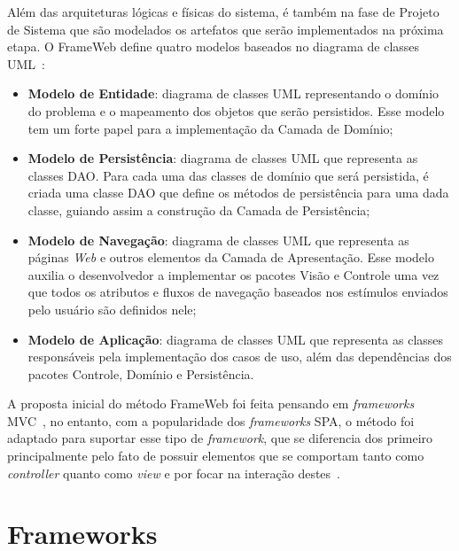 Além das arquiteturas lógicas e físicas do sistema, é também na fase de Projeto de Sistema
que são modelados os artefatos que serão implementados na próxima etapa. O FrameWeb define
quatro modelos baseados no diagrama de classes UML~\cite{souza:2007,souza:2020}:


\begin{itemize}
    \item \textbf{Modelo de Entidade}: diagrama de classes UML representando o domínio do 
        problema e o mapeamento dos objetos que serão persistidos. Esse modelo tem um forte
        papel para a implementação da Camada de Domínio;

    \item \textbf{Modelo de Persistência}: diagrama de classes UML que representa as classes
        DAO. Para cada uma das classes de domínio que será persistida, é criada uma classe DAO
        que define os métodos de persistência para uma dada classe, guiando assim a 
        construção da Camada de Persistência;
    
    \item \textbf{Modelo de Navegação}: diagrama de classes UML que representa as páginas \textit{Web}
        e outros elementos da Camada de Apresentação. Esse modelo auxilia o desenvolvedor a
        implementar os pacotes Visão e Controle uma vez que todos os atributos e fluxos de 
        navegação baseados nos estímulos enviados pelo usuário são definidos nele;

    \item \textbf{Modelo de Aplicação}: diagrama de classes UML que representa as classes
        responsáveis pela implementação dos casos de uso, além das dependências dos pacotes
        Controle, Domínio e Persistência.
\end{itemize}

A proposta inicial do método FrameWeb foi feita pensando em \textit{frameworks} MVC~\cite{souza:2007}, 
no entanto, com a popularidade dos \textit{frameworks} SPA, o método foi adaptado para suportar
esse tipo de \textit{framework}, que se diferencia dos primeiro principalmente pelo fato de possuir elementos que se comportam tanto como \textit{controller} quanto como 
\textit{view} e por focar na interação destes~\cite{hoppe:2023}.


\section{Frameworks}
\label{sec-fundteo-framework}

